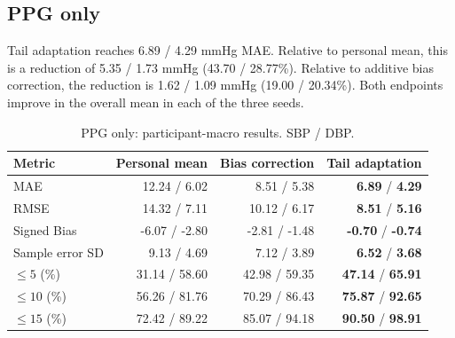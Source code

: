 \documentclass[conference]{IEEEtran}
\begin{document}
\subsection{PPG only}
Tail adaptation reaches 6.89 / 4.29 mmHg MAE. Relative to personal mean, this is a reduction of 5.35 / 1.73 mmHg (43.70 / 28.77\%). Relative to additive bias correction, the reduction is 1.62 / 1.09 mmHg (19.00 / 20.34\%). Both endpoints improve in the overall mean in each of the three seeds.
\begin{table}[ht]\centering\caption{PPG only: participant-macro results. SBP / DBP.}\scriptsize\setlength{\tabcolsep}{3pt}
\begin{tabular}{lrrr}\toprule
Metric & Personal mean & Bias correction & Tail adaptation\\\midrule
MAE & 12.24 / 6.02 & 8.51 / 5.38 & \textbf{6.89} / \textbf{4.29}\\
RMSE & 14.32 / 7.11 & 10.12 / 6.17 & \textbf{8.51} / \textbf{5.16}\\
Signed Bias & -6.07 / -2.80 & -2.81 / -1.48 & \textbf{-0.70} / \textbf{-0.74}\\
Sample error SD & 9.13 / 4.69 & 7.12 / 3.89 & \textbf{6.52} / \textbf{3.68}\\
$\leq5$ (\%) & 31.14 / 58.60 & 42.98 / 59.35 & \textbf{47.14} / \textbf{65.91}\\
$\leq10$ (\%) & 56.26 / 81.76 & 70.29 / 86.43 & \textbf{75.87} / \textbf{92.65}\\
$\leq15$ (\%) & 72.42 / 89.22 & 85.07 / 94.18 & \textbf{90.50} / \textbf{98.91}\\
\bottomrule\end{tabular}\end{table}
\end{document}
